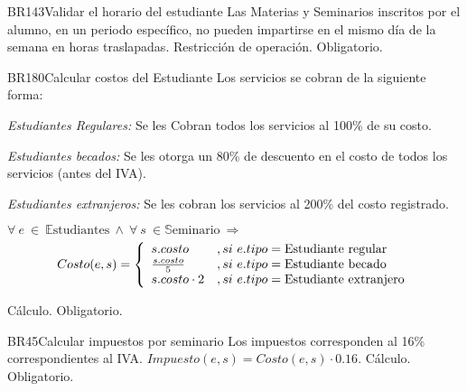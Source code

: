 \begin{BussinesRule}{BR143}{Validar el horario del estudiante}
	\BRitem[Descripción:] Las Materias y Seminarios inscritos por el alumno, en un periodo específico, no pueden impartirse en el mismo día de la semana en horas traslapadas.
	\BRitem[Tipo:] Restricción de operación.
	\BRitem[Nivel:] Obligatorio.
\end{BussinesRule}

\begin{BussinesRule}{BR180}{Calcular costos del Estudiante}
	\BRitem[Descripción:] Los servicios se cobran de la siguiente forma:
		\begin{Citemize}
			\item {\em Estudiantes Regulares:} Se les Cobran todos los servicios al 100\% de su costo.
			\item {\em Estudiantes becados:} Se les otorga un 80\% de descuento en el costo de todos los servicios (antes del IVA).
			\item {\em Estudiantes extranjeros:} Se les cobran los servicios al 200\% del costo registrado.
		\end{Citemize}
	\BRitem[Sentencia:] $\forall~e~\in~\mathbb{E}\textrm{studiantes}~\land~\forall~s~\in \mathbb{S}\textrm{eminario}~\Rightarrow$
		\begin{displaymath}
			Costo(e,s) = \left\{ \begin{array}{ll}
			s.costo & , si~e.tipo = \textrm{Estudiante regular}\\
			{s.costo}\over{5} & , si~e.tipo = \textrm{Estudiante becado}\\
			s.costo \cdot 2 & , si~e.tipo = \textrm{Estudiante extranjero}
			\end{array} \right.
		\end{displaymath}

	\BRitem[Tipo:] Cálculo.
	\BRitem[Nivel:] Obligatorio.
\end{BussinesRule}

\begin{BussinesRule}{BR45}{Calcular impuestos por seminario}
	\BRitem[Descripción:] Los impuestos corresponden al 16\% correspondientes al IVA.
	\BRitem[Sentencia:] $Impuesto(e, s) = Costo(e, s)\cdot0.16$.
	\BRitem[Tipo:] Cálculo.
	\BRitem[Nivel:] Obligatorio.
\end{BussinesRule}

